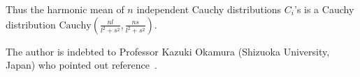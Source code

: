 \documentclass[11pt]{article}
\def\Cauchy{\mathrm{Cauchy}}
\begin{document}
Thus the harmonic mean of $n$ independent Cauchy distributions $C_i$'s is a Cauchy distribution  $\Cauchy\left(\frac{nl}{l^2+s^2},\frac{ns}{l^2+s^2}\right)$.

\vskip 0.5cm
 The author is indebted to Professor Kazuki Okamura (Shizuoka University, Japan) who pointed out reference~\cite{menon1962characterization}.
 


\end{document}

